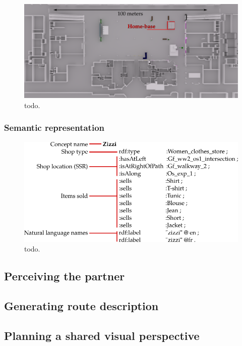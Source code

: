 \begin{figure}[ht!]
\centering
\includegraphics[scale=0.15]{figures/chapter8/ideapark_base_m.png}
\caption{\label{fig:chap8_ideapark_base} todo. }
\end{figure}

\subsubsection{Semantic representation}

\begin{figure}[ht!]
\centering
\includegraphics[scale=0.45]{figures/chapter8/zizzi.png}
\caption{\label{fig:chap8_zizzi} todo. }
\end{figure}

\subsection{Perceiving the partner}

\subsection{Generating route description}

\subsection{Planning a shared visual perspective}

